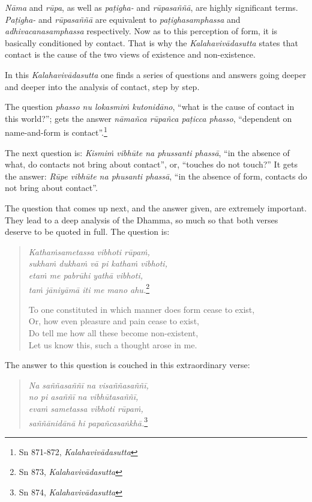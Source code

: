 \emph{Nāma} and \emph{rūpa}, as well as \emph{paṭigha-} and \emph{rūpasaññā}, are highly significant terms. \emph{Paṭigha-} and \emph{rūpasaññā} are equivalent to \emph{paṭighasamphassa} and \emph{adhivacanasamphassa} respectively. Now as to this perception of form, it is basically conditioned by contact. That is why the \emph{Kalahavivādasutta} states that contact is the cause of the two views of existence and non-existence.

In this \emph{Kalahavivādasutta} one finds a series of questions and answers going deeper and deeper into the analysis of contact, step by step.

The question \emph{phasso nu lokasmiṁ kutonidāno}, ``what is the cause of contact in this world?''; gets the answer \emph{nāmañca rūpañca paṭicca phasso}, ``dependent on name-and-form is contact''.\footnote{Sn 871-872, \emph{Kalahavivādasutta}}

The next question is: \emph{Kismiṁ vibhūte na phussanti phassā}, ``in the absence of what, do contacts not bring about contact'', or, ``touches do not touch?'' It gets the answer: \emph{Rūpe vibhūte na phusanti phassā}, ``in the absence of form, contacts do not bring about contact''.

The question that comes up next, and the answer given, are extremely important. They lead to a deep analysis of the Dhamma, so much so that both verses deserve to be quoted in full. The question is:

\begin{quote}
\emph{Kathaṁsametassa vibhoti rūpaṁ,}\\
\emph{sukhaṁ dukhaṁ vā pi kathaṁ vibhoti,}\\
\emph{etaṁ me pabrūhi yathā vibhoti,}\\
\emph{taṁ jāniyāmā iti me mano ahu.}\footnote{Sn 873, \emph{Kalahavivādasutta}}

To one constituted in which manner does form cease to exist,\\
Or, how even pleasure and pain cease to exist,\\
Do tell me how all these become non-existent,\\
Let us know this, such a thought arose in me.
\end{quote}

The answer to this question is couched in this extraordinary verse:

\begin{quote}
\emph{Na saññasaññī na visaññasaññī,}\\
\emph{no pi asaññī na vibhūtasaññī,}\\
\emph{evaṁ sametassa vibhoti rūpaṁ,}\\
\emph{saññānidānā hi papañcasaṅkhā.}\footnote{Sn 874, \emph{Kalahavivādasutta}}
\end{quote}

